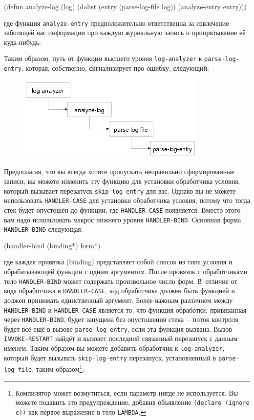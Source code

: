 \begin{myverb}
(defun analyze-log (log)
  (dolist (entry (parse-log-file log))
    (analyze-entry entry)))
\end{myverb}

\noindent{}где функция \lstinline{analyze-entry} предположительно ответственна за извлечение заботящей вас
информации про каждую журнальную запись и припрятывание её куда-нибудь.

Таким образом, путь от функции высшего уровня \lstinline{log-analyzer} к
\lstinline{parse-log-entry}, которая, собственно, сигнализирует про ошибку, следующий:

\begin{figure}[h]
  \centering
  \includegraphics[scale=0.6]{images/restart-call-stack.png}
\end{figure}

Предполагая, что вы всегда хотите пропускать неправильно сформированные записи, вы можете
изменить эту функцию для установки обработчика условия, который вызывает перезапуск
\lstinline{skip-log-entry} для вас. Однако вы не можете использовать \lstinline{HANDLER-CASE} для
установки обработчика условия, потому что тогда стек будет опустошён до функции, где
\lstinline{HANDLER-CASE} появляется. Вместо этого вам надо использовать макрос нижнего уровня
\lstinline{HANDLER-BIND}. Основная форма \lstinline{HANDLER-BIND} следующая:

\begin{myverb}
(handler-bind (binding*) form*)
\end{myverb}

\noindent{}где каждая привязка (binding) представляет собой список из типа условия и
обрабатывающей функции с одним аргументом. После провязок с обработчиками тело
\lstinline{HANDLER-BIND} может содержать произвольное число форм. В~отличие от кода
обработчика в \lstinline{HANDLER-CASE}, код обработчика должен быть функцией и должен
принимать единственный аргумент. Более важным различием между \lstinline{HANDLER-BIND} и
\lstinline{HANDLER-CASE} является то, что функция обработки, привязанная через
\lstinline{HANDLER-BIND}, будет запущена без опустошения стека~-- поток контроля будет всё
ещё в вызове \lstinline{parse-log-entry}, если эта функция вызвана. Вызов
\lstinline{INVOKE-RESTART} найдёт и вызовет последний связанный перезапуск с данным
именем. Таким образом вы можете добавить обработчик к \lstinline{log-analyzer}, который
будет вызывать \lstinline{skip-log-entry} перезапуск, установленный в
\lstinline{parse-log-file}, таким образом\footnote{Компилятор может возмутиться, если
  параметр нигде не используется. Вы можете подавить это предупреждение, добавив
  объявление \lstinline{(declare (ignore c))} как первое выражение в тело
\lstinline{LAMBDA}.}:

